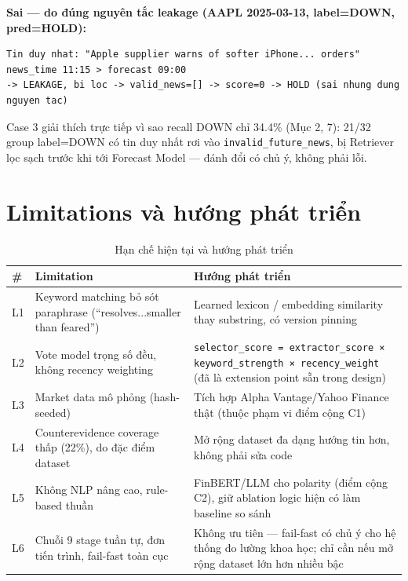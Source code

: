 \textbf{Sai — do đúng nguyên tắc leakage (AAPL 2025-03-13, label=DOWN, pred=HOLD):}
\begin{singlespace}
\begin{lstlisting}[numbers=none]
Tin duy nhat: "Apple supplier warns of softer iPhone... orders" news_time 11:15 > forecast 09:00
-> LEAKAGE, bi loc -> valid_news=[] -> score=0 -> HOLD (sai nhung dung nguyen tac)
\end{lstlisting}
\end{singlespace}

Case 3 giải thích trực tiếp vì sao recall DOWN chỉ 34.4\% (Mục 2, 7): 21/32 group label=DOWN có tin duy nhất rơi vào \texttt{invalid\_future\_news}, bị Retriever lọc sạch trước khi tới Forecast Model — đánh đổi có chủ ý, không phải lỗi.

\section{Limitations và hướng phát triển}

\begin{table}[H]
\centering
\caption{Hạn chế hiện tại và hướng phát triển}
\begin{tabularx}{\textwidth}{|l|X|X|}
\hline
\textbf{\#} & \textbf{Limitation} & \textbf{Hướng phát triển} \\ \hline
L1 & Keyword matching bỏ sót paraphrase (``resolves...smaller than feared'') & Learned lexicon / embedding similarity thay substring, có version pinning \\ \hline
L2 & Vote model trọng số đều, không recency weighting & \texttt{selector\_score = extractor\_score × keyword\_strength × recency\_weight} (đã là extension point sẵn trong design) \\ \hline
L3 & Market data mô phỏng (hash-seeded) & Tích hợp Alpha Vantage/Yahoo Finance thật (thuộc phạm vi điểm cộng C1) \\ \hline
L4 & Counterevidence coverage thấp (22\%), do đặc điểm dataset & Mở rộng dataset đa dạng hướng tin hơn, không phải sửa code \\ \hline
L5 & Không NLP nâng cao, rule-based thuần & FinBERT/LLM cho polarity (điểm cộng C2), giữ ablation logic hiện có làm baseline so sánh \\ \hline
L6 & Chuỗi 9 stage tuần tự, đơn tiến trình, fail-fast toàn cục & Không ưu tiên — fail-fast có chủ ý cho hệ thống đo lường khoa học; chỉ cần nếu mở rộng dataset lớn hơn nhiều bậc \\ \hline
\end{tabularx}
\end{table}


